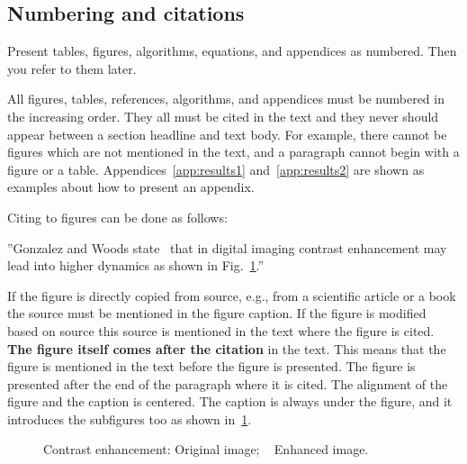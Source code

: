 \documentclass{lutmscthesis}[2017/10/03]
\begin{document}
\subsection{Numbering and citations}

Present tables, figures, algorithms, equations, and appendices as numbered. Then you refer to them later. 

All figures, tables, references, algorithms, and appendices must be numbered in the increasing order. 
They all must be cited in the text and they never should appear between a section headline and text body. 
For example, there cannot be figures which are not mentioned in the text, and a paragraph cannot begin with a figure or a table. 
Appendices~\ref{app:results1} and~\ref{app:results2} are shown as examples about how to present an appendix.  

Citing to figures can be done as follows:

”Gonzalez and Woods state~\cite{GonWoo:2002} 
that in digital imaging contrast enhancement may lead into higher dynamics 
as shown in Fig.~\ref{fig:contrast}.” 

If the figure is directly copied from source, e.g., from a scientific article or a book the source must be mentioned in the figure caption.  If the figure is modified based on source this source is mentioned in the text where the figure is cited. {\bf The figure itself comes after the citation} in the text. This means that the figure is mentioned in the text before the figure is presented. 
The figure is presented after the end of the paragraph where it is cited. The alignment of the figure and the caption is centered. 
The caption is always under the figure, and it introduces the subfigures too as shown in~\ref{fig:contrast}.

\begin{figure}[ht]
	\centering

 \caption[]{Contrast enhancement: 
Original image; 
~
Enhanced image.~\cite{GonWoo:2002}}
\label{fig:contrast}
\end{figure}
\end{document}
